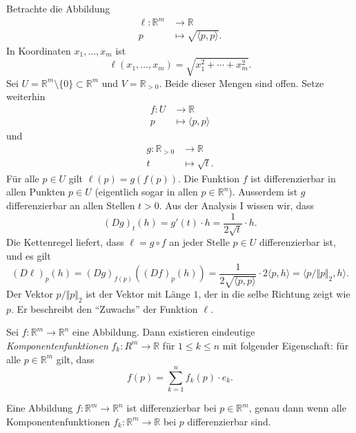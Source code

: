 \documentclass[../main.tex]{subfiles}
\begin{document}
\begin{example}
  Betrachte die Abbildung
  \begin{align*}
    \ell \colon \mathbb{R}^m & \to \mathbb{R} \\
    p & \mapsto \sqrt{\langle p, p \rangle}.
  \end{align*}
  In Koordinaten $x_1, \dots, x_m$ ist
   \[
     \ell(x_1, \dots, x_m) = \sqrt{x_1^2 + \cdots + x_m^2}.
  \]
  Sei $U = \mathbb{R}^m \setminus \{0\} \subset \mathbb{R}^m$ 
  und $V = \mathbb{R}_{>0}$.
  Beide dieser Mengen sind offen. Setze weiterhin
  \begin{align*}
    f \colon U & \to \mathbb{R} \\
    p & \mapsto \langle p, p \rangle
  \end{align*}
  und
  \begin{align*}
    g \colon \mathbb{R}_{>0} & \to \mathbb{R} \\
    t & \mapsto \sqrt t.
  \end{align*}
  Für alle $p \in U$ gilt $\ell(p) = g(f(p))$.
  Die Funktion $f$ ist differenzierbar in allen
  Punkten $p \in U$ 
  (eigentlich sogar in allen $p \in \mathbb{R}^n$).
  Ausserdem ist $g$ differenzierbar an allen Stellen
  $t > 0$.
  Aus der Analysis I wissen wir, dass
  \[
    {(Dg)}_t(h) = g'(t) \cdot h = \frac{1}{2 \sqrt t} \cdot h.
  \]
  Die Kettenregel liefert, dass
  $\ell = g \circ f$ an jeder Stelle $p \in U$ differenzierbar ist,
  und es gilt
  \[
    {(D \ell)}_p(h) = {(Dg)}_{f(p)}({(Df)}_p(h))
    = \frac{1}{2 \sqrt{\langle p, p \rangle}} \cdot 2 \langle p, h \rangle
    = \langle p / \Vert p \Vert_2, h \rangle.
  \]
  Der Vektor $p / \Vert p \Vert_2$ ist der Vektor mit Länge $1$,
  der in die selbe Richtung zeigt wie $p$.
  Er beschreibt den ``Zuwachs'' der Funktion $\ell$.
\end{example}

\begin{definition}
  Sei $f \colon \mathbb{R}^m \to \mathbb{R}^n$ eine Abbildung.
  Dann existieren eindeutige \emph{Komponentenfunktionen}
  $f_k \colon R^m \to \mathbb{R}$ 
  für $1 \leq k \leq n$ mit folgender Eigenschaft:
  für alle $p \in \mathbb{R}^m$ gilt, dass
  \[
    f(p) = \sum_{k=1}^{n} f_k(p) \cdot e_k.
  \]
\end{definition}

\begin{lemma*}
  Eine Abbildung $f \colon \mathbb{R}^m \to \mathbb{R}^n$ ist differenzierbar bei $p \in \mathbb{R}^m$,
  genau dann wenn alle Komponentenfunktionen 
  $f_k \colon \mathbb{R}^m \to \mathbb{R}$ bei $p$ differenzierbar sind.
\end{lemma*}
\end{document}
